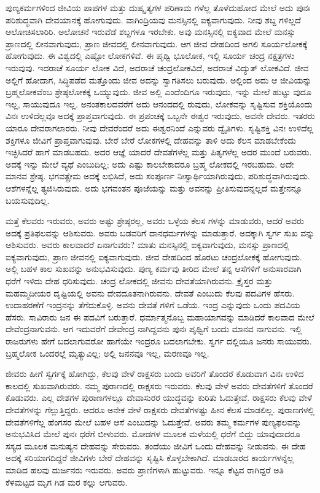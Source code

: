 ಪುಣ್ಯಕರ್ಮಗಳಿಂದ ಜೀವಿಯ ಪಾಪಗಳ ಮತ್ತು ದುಷ್ಕೃತ್ಯಗಳ ಪರಿಣಾಮ ಗಳೆಲ್ಲ ತೊಳೆದುಹೋದ ಮೇಲೆ ಅದು ಪುನಃ ಪರಿಶುದ್ಧವಾಗಿ ದೇವಯಾನಕ್ಕೆ ಹೋಗುವುದು. ವಾಗಿಂದ್ರಿಯವು ಮನಸ್ಸಿನಲ್ಲಿ ಐಕ್ಯವಾಗುವುದು. ನೀವು ಶಬ್ದ ಗಳಿಲ್ಲದೆ ಆಲೋಚಿಸಲಾರಿರಿ. ಅಲೋಚನೆ ಇರುವೆಡೆ ಶಬ್ದಗಳೂ ಇರಬೇಕು. ಅವು ಮನಸ್ಸಿನಲ್ಲಿ ಐಕ್ಯವಾದ ಮೇಲೆ ಮನಸ್ಸು ಪ್ರಾಣದಲ್ಲಿ ಲೀನವಾಗುವುದು, ಪ್ರಾಣ ಜೀವದಲ್ಲಿ ಲೀನವಾಗುವುದು. ಆಗ ಜೀವ ದೇಹದಿಂದ ಅಗಲಿ ಸೂರ್ಯಲೋಕಕ್ಕೆ ಹೋಗುವುದು. ಈ ವಿಶ್ವದಲ್ಲಿ ಎಷ್ಟೋ ಲೋಕಗಳಿವೆ. ಈ ಪೃಥ್ವಿ ಭೂಲೋಕ, ಇಲ್ಲಿ ಸೂರ್ಯ ಚಂದ್ರ ನಕ್ಷತ್ರಗಳು ಇರುವುವು. ಇದರಾಚೆ ಸೂರ್ಯ ಲೋಕ ವಿದೆ, ಅದರಾಚೆ ಚಂದ್ರಲೋಕವಿದೆ, ಅದರಾಚೆ ವಿದ್ಯುತ್​ ಲೋಕವಿದೆ. ಜೀವ ಅಲ್ಲಿಗೆ ಹೋದಾಗ, ಸಿದ್ಧಿಪಡೆದ ಮತ್ತೊಂದು ಜೀವ ಅದನ್ನು ಸ್ವಾಗತಿಸಲು ಬರುವುದು. ಅಲ್ಲಿಂದ ಅದು ಆ ಜೀವಿಯನ್ನು ಬ್ರಹ್ಮಲೋಕವೆಂಬ ಶ್ರೇಷ್ಠಲೋಕಕ್ಕೆ ಒಯ್ಯುವುದು. ಜೀವ ಅಲ್ಲಿ ಎಂದೆಂದಿಗೂ ಇರುವುದು, ಇನ್ನು ಮೇಲೆ ಹುಟ್ಟು ವುದೂ ಇಲ್ಲ, ಸಾಯುವುದೂ ಇಲ್ಲ. ಅನಂತಕಾಲದವರೆಗೆ ಅದು ಆನಂದದಲ್ಲಿ ರುವುದು, ಲೋಕವನ್ನು ಸೃಷ್ಟಿಸುವ ಶಕ್ತಿಯೊಂದು ವಿನಃ ಉಳಿದೆಲ್ಲವೂ ಅದಕ್ಕೆ ಪ್ರಾಪ್ತವಾಗುವುದು. ಈ ಪ್ರಪಂಚಕ್ಕೆ ಒಬ್ಬನೇ ಈಶ್ವರ ಇರುವುದು, ಅವನೇ ದೇವರು. ಇತರರು ಯಾರೂ ದೇವರಾಗಲಾರರು. ನೀವು ದೇವರೆಂದರೆ ಅದು ಈಶ್ವರನಿಂದೆ ಎನ್ನುವರು ದ್ವೈತಿಗಳು. ಸೃಷ್ಟಿಶಕ್ತಿ ವಿನಃ ಉಳಿದೆಲ್ಲ ಶಕ್ತಿಗಳೂ ಜೀವಿಗೆ ಪ್ರಾಪ್ತವಾಗುವುವು. ಬೇರೆ ಬೇರೆ ಲೋಕಗಳಲ್ಲಿ ದೇಹವನ್ನು ತಾಳಿ ಅದು ಕೆಲಸ ಮಾಡಬೇಕೆಂದು ಇಚ್ಛಿಸಿದರೆ ಹಾಗೆ ಮಾಡಬಹದು. ಅದರ ಆಜ್ಞೆ ಯಾದರೆ ದೇವತೆಗಳೆಲ್ಲ ಮತ್ತು ಪಿತೃಗಳೆಲ್ಲ ಅದರ ಮುಂದೆ ಬರುವರು. ಅದಕ್ಕೆ ಇನ್ನು ಮೇಲೆ ವ್ಯಥೆ ಎಂಬುದಿಲ್ಲ; ಅದು ಎಷ್ಟು ಕಾಲಬೇಕಾದರೂ ಬ್ರಹ್ಮ ಲೋಕದಲ್ಲಿ ಇರಬಹುದು. ಅದೇ ಮಾನವ ಶ್ರೇಷ್ಠ. ಭಗವತ್ಪ್ರೇಮ ಅದಕ್ಕೆ ಲಭಿಸಿದೆ, ಅದು ಸಂಪೂರ್ಣ ನಿಃಸ್ವಾರ್ಥಿಯಾಗಿರುವುದು, ಪರಿಶುದ್ಧವಾಗಿರುವುದು. ಆಶೆಗಳನ್ನೆಲ್ಲ ತ್ಯಜಿಸಿರುವುದು. ಅದು ಭಗವಂತನ ಪೂಜೆಯನ್ನು ಮತ್ತು ಅವನನ್ನು ಪ್ರೀತಿಸುವುದನ್ನಲ್ಲದೆ ಮತ್ತೇನನ್ನೂ ಬಯಸುವುದಿಲ್ಲ.

ಮತ್ತೆ ಕೆಲವರು ಇರುವರು, ಅವರು ಅಷ್ಟು ಶ್ರೇಷ್ಠರಲ್ಲ, ಅವರು ಒಳ್ಳೆಯ ಕೆಲಸ ಗಳನ್ನು ಮಾಡುವರು, ಆದರೆ ಅವರು ಅದಕ್ಕೆ ಪ್ರತಿಫಲವನ್ನು ಆಶಿಸುವರು. ಅವರು ಬಡವರಿಗೆ ದಾನಧರ್ಮಗಳನ್ನು ಮಾಡುತ್ತಾರೆ. ಅದಕ್ಕಾಗಿ ಸ್ವರ್ಗ ಸುಖ ವನ್ನು ಆಶಿಸುವರು. ಅವರು ಕಾಲವಾದರೆ ಏನಾಗುವರು? ಮಾತು ಮನಸ್ಸಿನಲ್ಲಿ ಐಕ್ಯವಾಗುವುದು, ಮನಸ್ಸು ಪ್ರಾಣದಲ್ಲಿ ಐಕ್ಯವಾಗುವುದು, ಪ್ರಾಣ ಜೀವನಲ್ಲಿ ಐಕ್ಯವಾಗುವುದು. ಜೀವ ದೇಹದಿಂದ ಹೊರಟು ಚಂದ್ರಲೋಕಕ್ಕೆ ಹೋಗುವುದು. ಅಲ್ಲಿ ಬಹಳ ಕಾಲ ಸುಖವನ್ನು ಅನುಭವಿಸುವುದು. ಪುಣ್ಯ ಕರ್ಮವು ತೀರಿದ ಮೇಲೆ ತನ್ನ ಆಸೆಗಳಿಗೆ ಅನುಸಾರವಾಗಿ ಧರೆಗೆ ಇಳಿದು ದೇಹ ಧರಿಸುವುದು. ಚಂದ್ರ ಲೋಕದಲ್ಲಿ ಜೀವನು ದೇವತೆಯಾಗಿರುವನು. ಕ್ರೈಸ್ತರ ಮತ್ತು ಮಹಮ್ಮದೀಯರ ದೃಷ್ಟಿಯಲ್ಲಿ ಅವನು ದೇವದೂತನಾಗಿರುವನು. ದೇವತೆ ಎಂಬುದು ಕೆಲವು ಪದವಿಗಳ ಹೆಸರು. ಉದಾಹರಣೆಗೆ ಇಂದ್ರನನ್ನು ತೆಗೆದುಕೊಳ್ಳಿ. ಅವನು ದೇವತೆ ಗಳಿಗೆ ಒಡೆಯ. ಇಂದ್ರ ಎನ್ನುವುದು ಒಂದು ಪದವಿಯ ಹೆಸರು. ಸಾವಿರಾರು ಜನ ಈ ಪದವಿಗೆ ಬರುತ್ತಾರೆ. ಧರ್ಮಾತ್ಮನೊಬ್ಬ ಮಹಾಯಾಗವನ್ನು ಮಾಡಿದರೆ ಕಾಲವಾದ ಮೇಲೆ ದೇವೆಂದ್ರನಾಗುವನು. ಆಗ ಇದುವರೆಗೆ ದೇವೇಂದ್ರ ನಾಗಿದ್ದವನು ಪುನಃ ಪೃಥ್ವಿಗೆ ಬಂದು ಮಾನವ ನಾಗುವನು. ಇಲ್ಲಿ ರಾಜರುಗಳು ಹೇಗೆ ಬದಲಾಗುವರೋ ಹಾಗೆಯೇ ಇಂದ್ರರೂ ಬದಲಾಗಬೇಕು. ಸ್ವರ್ಗ ದಲ್ಲಿಯೂ ಜನರು ಸಾಯುವರು. ಬ್ರಹ್ಮಲೋಕ ಒಂದರಲ್ಲೆ ಮೃತ್ಯುವಿಲ್ಲ; ಅಲ್ಲಿ ಜನನವೂ ಇಲ್ಲ, ಮರಣವೂ ಇಲ್ಲ.

ಜೀವರು ಹೀಗೆ ಸ್ವರ್ಗಕ್ಕೆ ಹೋಗಿದ್ದು, ಕೆಲವು ವೇಳೆ ರಾಕ್ಷಸರು ಬಂದು ಅವರಿಗೆ ತೊಂದರೆ ಕೊಡುವಾಗ ವಿನಃ ಉಳಿದ ಕಾಲದಲ್ಲಿ ಸುಖವಾಗಿರುವರು. ನಮ್ಮ ಪುರಾಣದಲ್ಲಿ ರಾಕ್ಷಸರು ಇರುವರು. ಕೆಲವು ವೇಳೆ ಅವರು ದೇವತೆಗಳಿಗೆ ತೊಂದರೆ ಕೊಡುವರು. ಎಲ್ಲ ದೇಶಗಳ ಪುರಾಣಗಳಲ್ಲೂ ದೇವಾಸುರರ ಯುದ್ಧವನ್ನು ಕುರಿತು ಓದುತ್ತೇವೆ. ರಾಕ್ಷಸರು ಕೆಲವು ವೇಳೆ ದೇವತೆಗಳನ್ನು ಗೆಲ್ಲುತ್ತಿದ್ದರು. ಆದರೂ ಅನೇಕ ವೇಳೆ ರಾಕ್ಷಸರು ದೇವತೆಗಳಷ್ಟು ಹೀನ ಕೆಲಸ ಮಾಡಲಿಲ್ಲ. ಪುರಾಣಗಳಲ್ಲಿ ದೇವತೆಗಳಿಗೆಲ್ಲ ಹೆಂಗಸರ ಮೇಲೆ ಬಹಳ ಆಸೆ ಎಂಬುದನ್ನು ಓದುತ್ತೇವೆ. ಅವರು ತಮ್ಮ ಕರ್ಮಗಳ ಪುಣ್ಯಫಲವನ್ನು ಅನುಭವಿಸಿದ ಮೇಲೆ ಪುನಃ ಧರೆಗೆ ಬೀಳುವರು. ಮೋಡಗಳ ಮೂಲಕ ಮಳೆಯಲ್ಲಿ ಧರೆಗೆ ಬಿದ್ದು ಯಾವುದಾದರೂ ಸಸ್ಯದ ಮೂಲಕ ಮನುಷ್ಯನ ದೇಹವನ್ನು ಸೇರುವರು. ತಂದೆಯು ಜೀವಿಗೆ ಒಂದು ದೇಹವನ್ನು ನೀಡುವನು. ಈ ದೇಹ ಅದಕ್ಕೆ ಸರಿಯಾಗದಿದ್ದರೆ ಜೀವಿಗಳು ಬೇರೆ ದೇಹವನ್ನು ಸೃಷ್ಟಿಸಿ ಕೊಳ್ಳಬೇಕಾಗಿದೆ. ಮಾಡಬಾರದ ಕಾರ್ಯಗಳನ್ನೆಲ್ಲ ಮಾಡಿದ ಹಲವು ದುರ್ಜನರು ಇರುವರು. ಅವರು ಪ್ರಾಣಿಗಳಾಗಿ ಹುಟ್ಟುವರು. ಇನ್ನೂ ಕೆಟ್ಟವ ರಾಗಿದ್ದರೆ ಅತಿ ಕೆಳಮಟ್ಟದ ಮೃಗ ಗಿಡ ಮರ ಕಲ್ಲು ಆಗುವರು.

